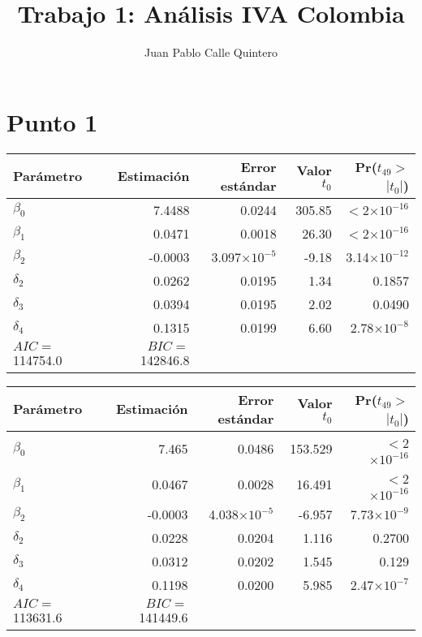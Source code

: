 \documentclass[11pt]{article}
\title{Trabajo 1: Análisis IVA Colombia}
\author{Juan Pablo Calle Quintero}
\begin{document}
\maketitle

\section*{Punto 1}

\begin{table}[ht]
\centering
\begin{tabular}{lrrrr}
\hline
 Parámetro & Estimación & Error estándar & Valor $t_0$ & Pr($t_{49}>$$|t_0|$) \\ 
  \hline
$\beta_0$ & 7.4488 & 0.0244 & 305.85 & $<$2$\times10^{-16}$ \\ 
  $\beta_1$ & 0.0471 & 0.0018 & 26.30 & $<$2$\times10^{-16}$ \\ 
  $\beta_2$ & -0.0003 & 3.097$\times10^{-5}$ & -9.18 & 3.14$\times10^{-12}$ \\ 
  $\delta_2$ & 0.0262 & 0.0195 & 1.34 & 0.1857 \\ 
  $\delta_3$ & 0.0394 & 0.0195 & 2.02 & 0.0490 \\ 
  $\delta_4$ & 0.1315 & 0.0199 & 6.60 & 2.78$\times10^{-8}$ \\ 
   \hline
	$AIC=$ 114754.0 & $BIC=$ 142846.8 & & & \\
	\hline
\end{tabular}
\end{table}

\begin{table}[ht]
\centering
\begin{tabular}{lrrrr}
\hline
 Parámetro& Estimación & Error estándar & Valor $t_0$ & Pr($t_{49}>$$|t_0|$) \\ 
  \hline
$\beta_0$ & 7.465 & 0.0486 & 153.529 & $<$2$\times10^{-16}$ \\ 
  $\beta_1$ & 0.0467 & 0.0028 & 16.491 & $<$2$\times10^{-16}$ \\ 
  $\beta_2$ & -0.0003 & 4.038$\times10^{-5}$ & -6.957 & 7.73$\times10^{-9}$ \\ 
  $\delta_2$ & 0.0228 & 0.0204 & 1.116 & 0.2700 \\ 
  $\delta_3$ & 0.0312 & 0.0202 & 1.545 & 0.129 \\ 
  $\delta_4$ & 0.1198 & 0.0200 & 5.985 & 2.47$\times10^{-7}$ \\ 
   \hline
	$AIC=$ 113631.6 & $BIC=$ 141449.6 & & & \\
	\hline
\end{tabular}
\end{table}
\end{document}
